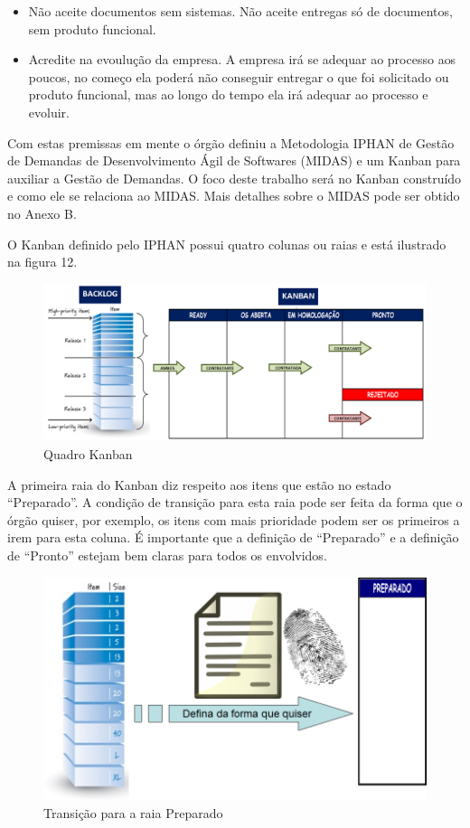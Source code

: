 \begin{itemize}
\item Não aceite documentos sem sistemas. Não aceite entregas só de documentos, sem produto funcional.
\item Acredite na evoulução da empresa. A empresa irá se adequar ao processo aos poucos, no começo ela poderá não conseguir entregar o que foi solicitado ou produto funcional, mas ao longo do tempo ela irá adequar ao processo e evoluir. 
\end{itemize} 

Com estas premissas em mente o órgão definiu a Metodologia IPHAN de Gestão de Demandas de Desenvolvimento Ágil de Softwares (MIDAS) e um Kanban para auxiliar a Gestão de Demandas. O foco deste trabalho será no Kanban construído e como ele se relaciona ao MIDAS. Mais detalhes sobre o MIDAS pode ser obtido no Anexo B. 

O Kanban definido pelo IPHAN possui quatro colunas ou raias e está ilustrado na figura 12.

\begin{figure}[h]
		\centering
		\label{fig05}
			\includegraphics[scale=0.5]{figuras/kanbanIPHAN1.png}
		\caption{Quadro Kanban  \cite{parente}}
\end{figure}

A primeira raia do Kanban diz respeito aos itens que estão no estado “Preparado”. A condição de transição para esta raia pode ser feita da forma que o órgão quiser, por exemplo, os itens com mais prioridade podem ser os primeiros a irem para esta coluna. É importante que a definição de “Preparado” e a definição de “Pronto” estejam bem claras para todos os envolvidos.  

\begin{figure}[h]
		\centering
		\label{fig06}
			\includegraphics[scale=0.5]{figuras/kanbanIPHAN2.png}
		\caption{Transição para a raia Preparado \cite{parente}}
\end{figure}

